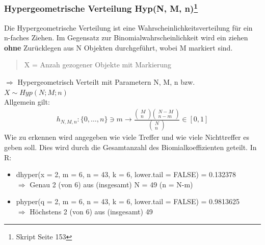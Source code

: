 \documentclass[a4paper,10pt]{scrartcl}
\begin{document}
\subsubsection[Hypergeometrische Verteilung Hyp(N, M, n)]{Hypergeometrische Verteilung Hyp(N, M, n)\footnote{Skript Seite 153}}
Die Hypergeometrische Verteilung ist eine Wahrscheinlichkeitsverteilung für ein n-faches Ziehen. Im Gegensatz zur Binomialwahrscheinlichkeit wird ein ziehen \textbf{ohne} Zurücklegen aus N Objekten durchgeführt, wobei M markiert sind.
\begin{quote}
X = Anzah gezogener Objekte mit Markierung
\end{quote}
$\Rightarrow$ Hypergeometrisch Verteilt mit Parametern N, M, n bzw. $X \sim Hyp(N;M;n)$\\
Allgemein gilt:
\begin{eqnarray*}
{h}_{N,M,n}:\{0,\ldots, n\}\ni m\to \frac{\left(\begin{array}{c}M\\ n\end{array}\right)\left(\begin{array}{c}N-M\\ n-m\end{array}\right)}{\left(\begin{array}{c}N\\ n\end{array}\right)}\in [0,1]
\end{eqnarray*}
Wie zu erkennen wird angegeben wie viele Treffer und wie viele Nichttreffer es geben soll. Dies wird durch die Gesamtanzahl des Biomialkoeffizienten geteilt. In R:
\begin{itemize}
    \item dhyper(x = 2, m = 6, n = 43,  k = 6, lower.tail = FALSE) = 0.132378\\
    $\Rightarrow$ Genau 2 (von 6) aus (insgesamt) N = 49 (n = N-m)
    \item phyper(q = 2, m = 6, n = 43,  k = 6, lower.tail = FALSE) = 0.9813625\\
    $\Rightarrow$ Höchstens 2 (von 6) aus (insgesamt) 49
\end{itemize}
\end{document}
